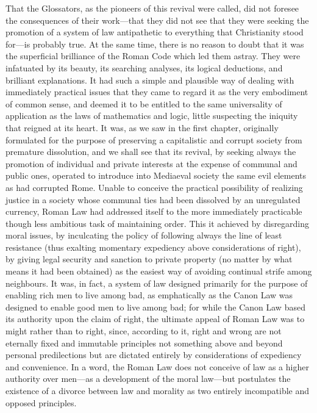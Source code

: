 \documentclass{book}
\begin{document}
That the Glossators, as the pioneers of this revival were called, did not foresee the consequences of their work—that they did not see that they were seeking the promotion of a system of law antipathetic to everything that Christianity stood for—is probably true. At the same time, there is no reason to doubt that it was the superficial brilliance of the Roman Code which led them astray. They were infatuated by its beauty, its searching analyses, its logical deductions, and brilliant explanations. It had such a simple and plausible way of dealing with immediately practical issues that they came to regard it as the very embodiment of common sense, and deemed it to be entitled to the same universality of application as the laws of mathematics and logic, little suspecting the iniquity that reigned at its heart. It was, as we saw in the first chapter, originally formulated for the purpose of preserving a capitalistic and corrupt society from premature dissolution, and we shall see that its revival, by seeking always the promotion of individual and private interests at the expense of communal and public ones, operated to introduce into Mediaeval society the same evil elements as had corrupted Rome. Unable to conceive the practical possibility of realizing justice in a society whose communal ties had been dissolved by an unregulated currency, Roman Law had addressed itself to the more immediately practicable though less ambitious task of maintaining order. This it achieved by disregarding moral issues, by inculcating the policy of following always the line of least resistance (thus exalting momentary expediency above considerations of right), by giving legal security and sanction to private property (no matter by what means it had been obtained) as the easiest way of avoiding continual strife among neighbours. It was, in fact, a system of law designed primarily for the purpose of enabling rich men to live among bad, as emphatically as the Canon Law was designed to enable good men to live among bad; for while the Canon Law based its authority upon the claim of right, the ultimate appeal of Roman Law was to might rather than to right, since, according to it, right and wrong are not eternally fixed and immutable principles not something above and beyond personal predilections but are dictated entirely by considerations of expediency and convenience. In a word, the Roman Law does not conceive of law as a higher authority over men—as a development of the moral law—but postulates the existence of a divorce between law and morality as two entirely incompatible and opposed principles.
\end{document}
